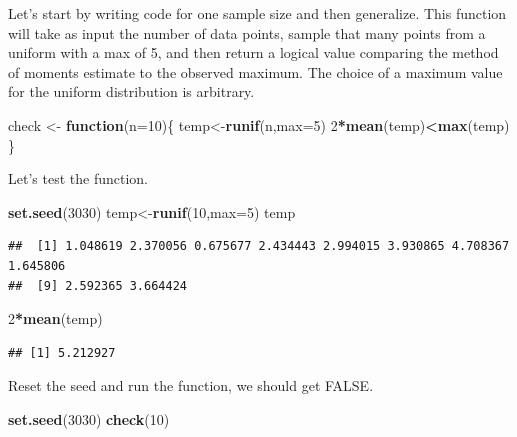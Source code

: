 \documentclass[
]{book}
\newenvironment{Shaded}{\begin{snugshade}}{\end{snugshade}}
\newcommand{\ControlFlowTok}[1]{\textcolor[rgb]{0.13,0.29,0.53}{\textbf{#1}}}
\newcommand{\DataTypeTok}[1]{\textcolor[rgb]{0.13,0.29,0.53}{#1}}
\newcommand{\DecValTok}[1]{\textcolor[rgb]{0.00,0.00,0.81}{#1}}
\newcommand{\KeywordTok}[1]{\textcolor[rgb]{0.13,0.29,0.53}{\textbf{#1}}}
\newcommand{\NormalTok}[1]{#1}
\newcommand{\OperatorTok}[1]{\textcolor[rgb]{0.81,0.36,0.00}{\textbf{#1}}}
\newcommand{\StringTok}[1]{\textcolor[rgb]{0.31,0.60,0.02}{#1}}
\begin{document}
Let's start by writing code for one sample size and then generalize. This function will take as input the number of data points, sample that many points from a uniform with a max of 5, and then return a logical value comparing the method of moments estimate to the observed maximum. The choice of a maximum value for the uniform distribution is arbitrary.

\begin{Shaded}
\begin{Highlighting}[]
\NormalTok{check <-}\StringTok{ }\ControlFlowTok{function}\NormalTok{(}\DataTypeTok{n=}\DecValTok{10}\NormalTok{)\{}
\NormalTok{  temp<-}\KeywordTok{runif}\NormalTok{(n,}\DataTypeTok{max=}\DecValTok{5}\NormalTok{)}
  \DecValTok{2}\OperatorTok{*}\KeywordTok{mean}\NormalTok{(temp)}\OperatorTok{<}\KeywordTok{max}\NormalTok{(temp)}
\NormalTok{\}}
\end{Highlighting}
\end{Shaded}

Let's test the function.

\begin{Shaded}
\begin{Highlighting}[]
\KeywordTok{set.seed}\NormalTok{(}\DecValTok{3030}\NormalTok{)}
\NormalTok{temp<-}\KeywordTok{runif}\NormalTok{(}\DecValTok{10}\NormalTok{,}\DataTypeTok{max=}\DecValTok{5}\NormalTok{)}
\NormalTok{temp}
\end{Highlighting}
\end{Shaded}

\begin{verbatim}
##  [1] 1.048619 2.370056 0.675677 2.434443 2.994015 3.930865 4.708367 1.645806
##  [9] 2.592365 3.664424
\end{verbatim}

\begin{Shaded}
\begin{Highlighting}[]
\DecValTok{2}\OperatorTok{*}\KeywordTok{mean}\NormalTok{(temp)}
\end{Highlighting}
\end{Shaded}

\begin{verbatim}
## [1] 5.212927
\end{verbatim}

Reset the seed and run the function, we should get FALSE.

\begin{Shaded}
\begin{Highlighting}[]
\KeywordTok{set.seed}\NormalTok{(}\DecValTok{3030}\NormalTok{)}
\KeywordTok{check}\NormalTok{(}\DecValTok{10}\NormalTok{)}
\end{Highlighting}
\end{Shaded}
\end{document}
